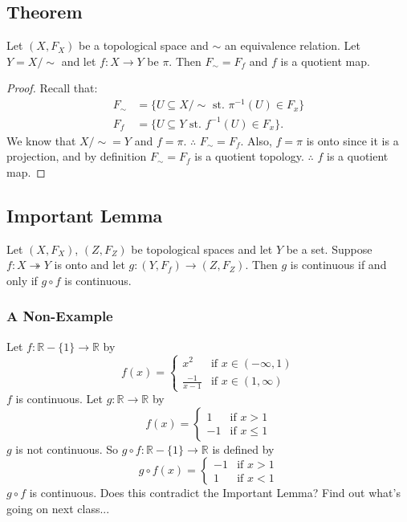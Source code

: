 \documentclass[12pt]{amsart}
\begin{document}
\subsection{Theorem} Let $(X,F_X)$ be a topological space and $\sim$ an equivalence relation. Let $Y = X/\sim$ and let $f : X \rightarrow Y$ be $\pi$. Then $F_\sim = F_f$ and $f$ is a quotient map.

\begin{proof} Recall that:
\begin{align*}
	F_\sim &= \{ U \subseteq X/\sim \text{ st. } \pi^{-1} (U) \in F_x \} \\
	F_f		 &= \{ U \subseteq Y \text{ st. } f^{-1} (U) \in F_x \}.
\end{align*}
We know that $X/\sim = Y$ and $f = \pi$. $\therefore$ $F_\sim = F_f$. Also, $f = \pi$ is onto since it is a projection, and by definition $F_\sim = F_f$ is a quotient topology. $\therefore$ $f$ is a quotient map.
\end{proof}

\subsection{Important Lemma} Let $(X,F_X)$, $(Z,F_Z)$ be topological spaces and let $Y$ be a set. Suppose $f: X \twoheadrightarrow Y$ is onto and let $g: (Y,F_f) \rightarrow (Z,F_Z)$. Then $g$ is continuous if and only if $g \circ f$ is continuous.

\subsubsection{A Non-Example} Let $f: \mathbb{R}-\{1\} \rightarrow \mathbb{R}$ by
\begin{displaymath}
   f(x) = \left\{
     \begin{array}{rl}
       x^2 						& \text{if } x \in (-\infty,1) \\
       \frac{-1}{x-1} & \text{if } x \in (1,\infty)
     \end{array}
   \right.
\end{displaymath} 
$f$ is continuous. Let $g: \mathbb{R} \rightarrow \mathbb{R}$ by
\begin{displaymath}
   f(x) = \left\{
     \begin{array}{rl}
       1  & \text{if } x > 1 \\
       -1 & \text{if } x \leq 1
     \end{array}
   \right.
\end{displaymath} 
$g$ is not continuous. So $g \circ f: \mathbb{R}-\{1\} \rightarrow \mathbb{R}$ is defined by
\begin{displaymath}
   g \circ f(x) = \left\{
     \begin{array}{rl}
       -1  & \text{if } x > 1 \\
       1 & \text{if } x < 1
     \end{array}
   \right.
\end{displaymath}
$g \circ f$ is continuous. Does this contradict the Important Lemma? Find out what's going on next class...
\end{document}

